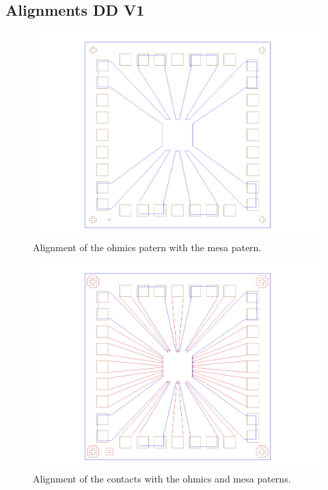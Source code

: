 \documentclass[12pt,a4paper]{report}
\begin{document}
\subsection{Alignments DD V1}

\begin{figure} [h] \centering
\includegraphics[scale=0.3]{fig/align1.pdf}
\caption{Alignment of the ohmics patern with the mesa patern.} \label{align1}
\end{figure}

\begin{figure} [h] \centering
\includegraphics[scale=0.3]{fig/align2.pdf}
\caption{Alignment of the contacts with the ohmics and mesa paterns.} \label{align2}
\end{figure}

\newpage
\end{document}

